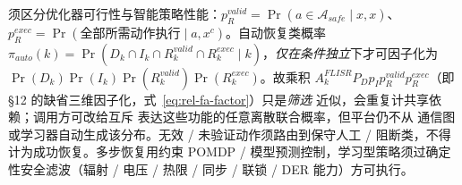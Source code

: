 \begin{remark}[策略成功与筛选近似]\label{rem:rel-icp-policy}
须区分优化器可行性与智能策略性能：$p_R^{valid}=\Pr(a\in\mathcal A_{safe}\mid\hat x,x)$、
$p_R^{exec}=\Pr(\text{全部所需动作执行}\mid a,x^c)$。自动恢复类概率
$\pi_{auto}(k)=\Pr(D_k\cap I_k\cap R_k^{valid}\cap R_k^{exec}\mid k)$，\emph{仅在条件独立}下才可因子化为
$\Pr(D_k)\Pr(I_k)\Pr(R_k^{valid})\Pr(R_k^{exec})$。故乘积
$A_k^{FLISR}P_D p_I p_R^{valid}p_R^{exec}$（即 §12 的缺省三维因子化，式~\eqref{eq:rel-fa-factor}）只是\emph{筛选}
近似，会重复计共享依赖；调用方可改给互斥  表达这些功能的任意离散联合概率，但平台仍不从
通信图或学习器自动生成该分布。无效 / 未验证动作须路由到保守人工 / 阻断类，不得计为成功恢复。多步恢复用约束
POMDP / 模型预测控制，学习型策略须过确定性安全滤波（辐射 / 电压 / 热限 / 同步 / 联锁 / DER 能力）方可执行。
\end{remark}

